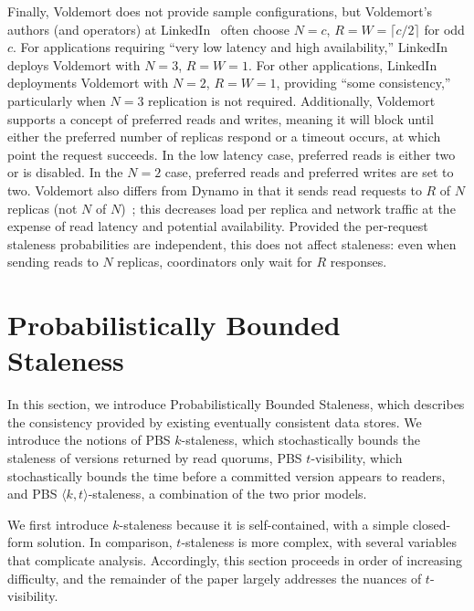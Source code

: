 \documentclass{vldb}
\newcommand{\sectionskip}{-0em}
\begin{document}
 Finally, Voldemort does not provide sample configurations, but
 Voldemort's authors (and operators) at LinkedIn~\cite{feinbergpc}
 often choose $N$$=$$c$, $R$$=$$W$$=$$ \lceil c/2 \rceil$ for odd $c$.
 For applications requiring ``very low latency and high
 availability,'' LinkedIn deploys Voldemort with $N$$=$$3$,
 $R$$=$$W$$=$$1$.  For other applications, LinkedIn deployments
 Voldemort with $N$$=$$2$, $R$$=$$W$$=$$1$, providing ``some
 consistency,'' particularly when $N$$=$$3$ replication is not
 required.  Additionally, Voldemort supports a concept of preferred
 reads and writes, meaning it will block until either the preferred
 number of replicas respond or a timeout occurs, at which point the
 request succeeds.  In the low latency case, preferred reads is either
 two or is disabled.  In the $N$$=$$2$ case, preferred reads and
 preferred writes are set to two.  Voldemort also differs from Dynamo
 in that it sends read requests to $R$ of $N$ replicas (not $N$ of
 $N$)~\cite{voldemortpub}; this decreases load per replica and network
 traffic at the expense of read latency and potential availability.
 Provided the per-request staleness probabilities are independent,
 this does not affect staleness: even when sending reads to
 $N$ replicas, coordinators only wait for $R$ responses.


\vspace{\sectionskip}\section{Probabilistically Bounded\\Staleness}
\label{sec:pbs}

In this section, we introduce Probabilistically Bounded Staleness,
which describes the consistency provided by existing eventually
consistent data stores.  We introduce the notions of PBS
$k$-staleness, which stochastically bounds the staleness of versions
returned by read quorums, PBS $t$-visibility, which stochastically
bounds the time before a committed version appears to readers, and PBS
$\langle k, t \rangle$-staleness, a combination of the two prior
models.

We first introduce $k$-staleness because it is self-contained, with a
simple closed-form solution.  In comparison, $t$-staleness is more
complex, with several variables that complicate analysis.
Accordingly, this section proceeds in order of increasing difficulty,
and the remainder of the paper largely addresses the nuances of
$t$-visibility.
\end{document}

